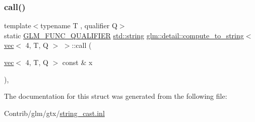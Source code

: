 \subsubsection{\texorpdfstring{call()}{call()}}
{\footnotesize\ttfamily template$<$typename T , qualifier Q$>$ \\
static \mbox{\hyperlink{setup_8hpp_a33fdea6f91c5f834105f7415e2a64407}{G\+L\+M\+\_\+\+F\+U\+N\+C\+\_\+\+Q\+U\+A\+L\+I\+F\+I\+ER}} \mbox{\hyperlink{_s_d_l__opengl__glext_8h_ae84541b4f3d8e1ea24ec0f466a8c568b}{std\+::string}} \mbox{\hyperlink{structglm_1_1detail_1_1compute__to__string}{glm\+::detail\+::compute\+\_\+to\+\_\+string}}$<$ \mbox{\hyperlink{structglm_1_1vec}{vec}}$<$ 4, T, Q $>$ $>$\+::call (\begin{DoxyParamCaption}\item[{\mbox{\hyperlink{structglm_1_1vec}{vec}}$<$ 4, T, Q $>$ const \&}]{x }\end{DoxyParamCaption})\hspace{0.3cm}{\ttfamily [inline]}, {\ttfamily [static]}}



The documentation for this struct was generated from the following file\+:\begin{DoxyCompactItemize}
\item 
Contrib/glm/gtx/\mbox{\hyperlink{string__cast_8inl}{string\+\_\+cast.\+inl}}\end{DoxyCompactItemize}
